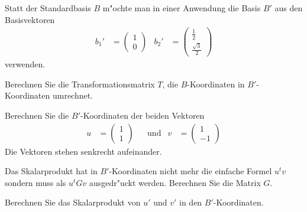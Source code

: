 Statt der Standardbasis $B$ m"ochte man in einer Anwendung die Basis
$B'$ aus den Basisvektoren
\[
\begin{aligned}
b_1'
&=
\begin{pmatrix}1\\0\end{pmatrix}
&
b_2'
&=
\begin{pmatrix}\frac12\\\frac{\sqrt{3}}2\end{pmatrix}
\end{aligned}
\]
verwenden.
\begin{teilaufgaben}
\item
Berechnen Sie die Transformationsmatrix $T$, die $B$-Koordinaten
in $B'$-Koordinaten umrechnet.
\item
Berechnen Sie die $B'$-Koordinaten der beiden Vektoren
\[
\begin{aligned}
u&=\begin{pmatrix}1\\1\end{pmatrix}
&&\text{und}&
v&=\begin{pmatrix}1\\-1\end{pmatrix}
\end{aligned}
\]
Die Vektoren stehen senkrecht aufeinander.
\item
Das Skalarprodukt hat in $B'$-Koordinaten nicht mehr die einfache
Formel $u^tv$ sondern muss als $u^tGv$ ausgedr"uckt werden.
Berechnen Sie die Matrix $G$.
\item 
Berechnen Sie das Skalarprodukt von $u'$ und $v'$ in den $B'$-Koordinaten.
\end{teilaufgaben}

